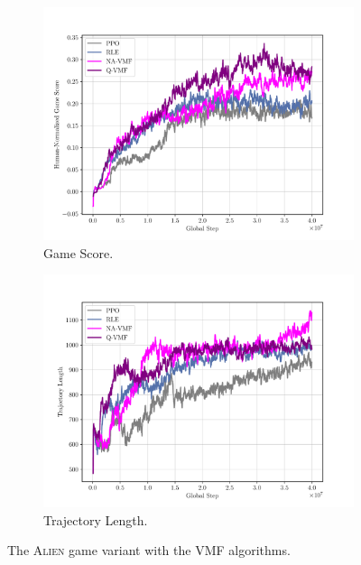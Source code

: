 \documentclass[10pt]{article} %
\begin{document}
\begin{figure}[h]
  \centering
  \begin{subfigure}[b]{0.35\textwidth}
    \includegraphics[width=\textwidth]{figures/plot_Alien_VMF Human-Normalized Game Score.pdf}
    \caption{Game Score.}
    \label{fig:vmf-game-score}
  \end{subfigure}
  \hspace{0.1\textwidth}
  \begin{subfigure}[b]{0.35\textwidth}
    \includegraphics[width=\textwidth]{figures/plot_Alien_VMF Trajectory Length.pdf}
    \caption{Trajectory Length.}
    \label{fig:vmf-trajectory-length}
  \end{subfigure}
  \label{fig:vmf-variant}
  \caption{The \textsc{Alien} game variant with the VMF algorithms.}
\end{figure}
\end{document}
